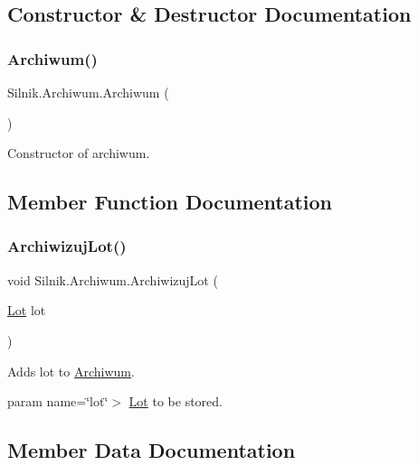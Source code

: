 \subsection{Constructor \& Destructor Documentation}
\mbox{\label{class_silnik_1_1_archiwum_a978b39abcf7b619f1343787959d36731}} 
\subsubsection{\texorpdfstring{Archiwum()}{Archiwum()}}
{\footnotesize\ttfamily Silnik.\+Archiwum.\+Archiwum (\begin{DoxyParamCaption}{ }\end{DoxyParamCaption})}



Constructor of archiwum. 



\subsection{Member Function Documentation}
\mbox{\label{class_silnik_1_1_archiwum_a55062cd277f767f8f2914561940c132d}} 
\subsubsection{\texorpdfstring{Archiwizuj\+Lot()}{ArchiwizujLot()}}
{\footnotesize\ttfamily void Silnik.\+Archiwum.\+Archiwizuj\+Lot (\begin{DoxyParamCaption}\item[{\mbox{\hyperlink{class_silnik_1_1_lot}{Lot}}}]{lot }\end{DoxyParamCaption})}



Adds lot to \mbox{\hyperlink{class_silnik_1_1_archiwum}{Archiwum}}. 

param name=\char`\"{}lot\char`\"{}$>$ \mbox{\hyperlink{class_silnik_1_1_lot}{Lot}} to be stored.

\subsection{Member Data Documentation}
\mbox{\label{class_silnik_1_1_archiwum_adbd91fcc4f5c9910b1996fde639518ae}} 
